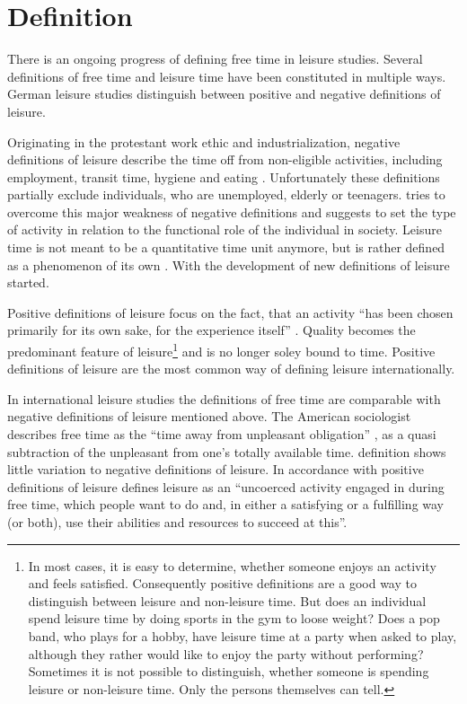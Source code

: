 \documentclass[12pt,numbers=noenddot,parskip,bibliography=totocnumbered,listof=totocnumbered]{scrreprt}
\begin{document}
\section{Definition}

There is an ongoing progress of defining free time in leisure studies. Several definitions of free time and leisure time have been constituted in multiple ways. German leisure studies distinguish between positive and negative definitions of leisure. 

Originating in the protestant work ethic \citep[p.27]{weber2006} and industrialization, negative definitions of leisure describe the time off from non-eligible activities, including employment, transit time, hygiene and eating \citep[p.137]{prahl2002}. Unfortunately these definitions partially exclude individuals, who are unemployed, elderly or teenagers. \citeauthor{scheuch1972} tries to overcome this major weakness of negative definitions and suggests to set the type of activity in relation to the functional role of the individual in society. Leisure time is not meant to be a quantitative time unit anymore, but is rather defined as a phenomenon of its own \citep[p.31]{scheuch1972}. With \citeauthor{scheuch1972} the development of new definitions of leisure started.

Positive definitions of leisure focus on the fact, that an activity ``has been chosen primarily for its own sake, for the experience itself'' \citep[p.15]{freysinger2000}. Quality becomes the predominant feature of leisure\footnote{In most cases, it is easy to determine, whether someone enjoys an activity and feels satisfied. Consequently positive definitions are a good way to distinguish between leisure and non-leisure time. But does an individual spend leisure time by doing sports in the gym to loose weight? Does a pop band, who plays for a hobby, have leisure time at a party when asked to play, although they rather would like to enjoy the party without performing? Sometimes it is not possible to distinguish, whether someone is spending leisure or non-leisure time. Only the persons themselves can tell.} and is no longer soley bound to time. Positive definitions of leisure are the most common way of defining leisure internationally.

In international leisure studies the definitions of free time are comparable with negative definitions of leisure mentioned above. The American sociologist \citeauthor{stebbins2007} describes free time as the ``time away from unpleasant obligation'' \cite[p.4]{stebbins2007}, as a quasi subtraction of the unpleasant from one's totally available time. \citeauthor{stebbins2007} definition shows little variation to negative definitions of leisure. In accordance with positive definitions of leisure \citeauthor{stebbins2007} defines leisure as an ``uncoerced  activity engaged in during free time, which people want to do and, in either a satisfying or a fulfilling way (or both), use their abilities and resources to succeed at this''. 
\end{document}
